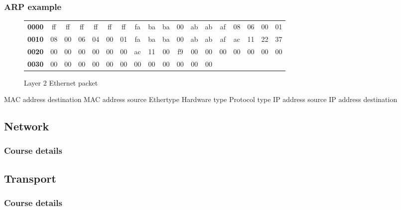   \begin{frame}
    \frametitle{ARP example}
      \begin{figure}
      \centering
      \resizebox{11.5cm}{!} {
        \begin{tabular}{lccccccccccccccccc}
          \textbf{0000} & \color{red}ff & \color{red}ff & \color{red}ff & \color{red}ff & \color{red}ff & \color{red}ff & \color{Marroon}fa & \color{Marroon}ba & \color{Marroon}ba & \color{Marroon}00 & \color{Marroon}ab & \color{Marroon}ab & \color{Marroon}af & \color{blue}08 & \color{blue}06 & \color{magenta}00 & \color{magenta}01 \\
          \textbf{0010} & \color{OliveGreen}08 & \color{OliveGreen}00 & \color{gray}06 & \color{gray}04 & \color{gray}00 & \color{gray}01 & \color{Marroon}fa & \color{Marroon}ba & \color{Marroon}ba & \color{Marroon}00 & \color{Marroon}ab & \color{Marroon}ab & \color{Marroon}af & \color{brown}ac & \color{brown}11 & \color{brown}22 & \color{brown}37 \\
          \textbf{0020} & \color{red}00 & \color{red}00 & \color{red}00 & \color{red}00 & \color{red}00 & \color{red}00 & \color{orange}ac & \color{orange}11 & \color{orange}00 & \color{orange}f9 & 00 & 00 & 00 & 00 & 00 & 00 & 00 \\
          \textbf{0030} & 00 & 00 & 00 & 00 & 00 & 00 & 00 & 00 & 00 & 00 & 00 & 00 \\
        \end{tabular}
      }
      \caption{Layer 2 Ethernet packet}
      \label{fig:arp_packet_ex}
    \end{figure}
    \color{red}MAC address destination \color{Marroon}MAC address source \color{blue}Ethertype \color{magenta}Hardware type \color{OliveGreen}Protocol type \color{brown} IP address source \color{orange} IP address destination
  \end{frame}


  \subsection{Network}
  \begin{frame}
    \frametitle{Course details}
  \end{frame}
\subsection{Transport}
  \begin{frame}
    \frametitle{Course details}
  \end{frame}
